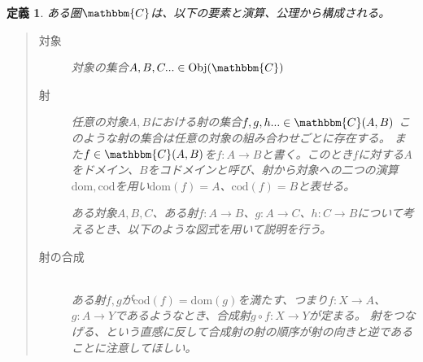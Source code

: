 \documentclass[dvipdfmx]{jsarticle}
\newcommand{\cat}[1]{\mathbbm{#1}}
\newcommand{\arrow}{\rightarrow}
\newcommand{\obj}[1]{\mathrm{Obj}(\cat{#1})}
\newcommand{\mor}[3]{#1:#2\arrow #3}
\newcommand{\dom}{\mathrm{dom}}
\newcommand{\cod}{\mathrm{cod}}
\newcommand{\arset}[3]{\cat{#1}(#2,#3)}
\newtheorem{define}{定義}[section]
\numberwithin{proof}{subsection}
\numberwithin{prop}{subsection}
\numberwithin{define}{subsection}
\begin{document}
	\begin{define}
		ある圏$\cat{C}$は、以下の要素と演算、公理から構成される。
		\begin{quote}
			\begin{description}
			\item[対象] 対象の集合$A,B,C...\in\obj{C}$
			\item[射] 任意の対象$A,B$における射の集合$f,g,h...\in\arset{C}{A}{B}$
			このような射の集合は任意の対象の組み合わせごとに存在する。
			また$f\in\arset{C}{A}{B}$を$\mor{f}{A}{B}$と書く。このとき$f$に対する$A$をドメイン、$B$をコドメインと呼び、射から対象への二つの演算$\dom,\cod$を用い$\dom(f)=A$、$\cod(f)=B$と表せる。

			ある対象$A,B,C$、ある射$\mor{f}{A}{B}$、$\mor{g}{A}{C}$、$\mor{h}{C}{B}$について考えるとき、以下のような図式を用いて説明を行う。
			\begin{center}
			\end{center}

			\item[射の合成]~\\ ある射$f,g$が$\cod(f)=\dom(g)$を満たす、つまり$\mor{f}{X}{A}$、$\mor{g}{A}{Y}$であるようなとき、合成射$\mor{g\circ f}{X}{Y}$が定まる。
			射をつなげる、という直感に反して合成射の射の順序が射の向きと逆であることに注意してほしい。


\end{description}
\end{quote}
\end{define}
\end{document}
